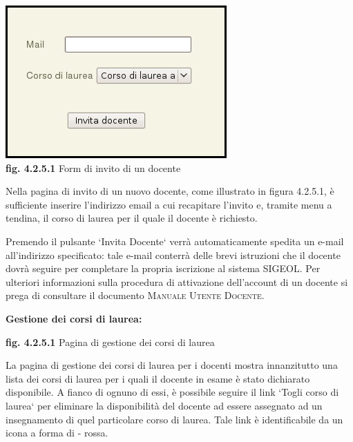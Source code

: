 \documentclass[11pt,a4paper]{article}
\begin{document}
\bigskip
\begin{center}
	\includegraphics[scale=0.5]{images/invito_docenti.jpg}\\
	\textbf{fig. 4.2.5.1} Form di invito di un docente\\
\end{center}
\bigskip

Nella pagina di invito di un nuovo docente, come illustrato in figura 4.2.5.1, è sufficiente inserire l'indirizzo email a cui recapitare l'invito e, tramite menu a tendina, il corso di laurea per il quale il docente è richiesto.

Premendo il pulsante `Invita Docente` verrà automaticamente spedita un e-mail all'indirizzo specificato: tale e-mail conterrà delle brevi istruzioni che il docente dovrà seguire per completare la propria iscrizione al sistema SIGEOL.
Per ulteriori informazioni sulla procedura di attivazione dell'account di un docente si prega di consultare il documento \textsc{Manuale Utente Docente}.
\newline \newline
\begin{large}\textbf{Gestione dei corsi di laurea:}\end{large}

\bigskip
\begin{center}
	\textbf{fig. 4.2.5.1} Pagina di gestione dei corsi di laurea\\
\end{center}
\bigskip

La pagina di gestione dei corsi di laurea per i docenti mostra innanzitutto una lista dei corsi di laurea per i quali il docente in esame è stato dichiarato disponibile. A fianco di ognuno di essi, è possibile seguire il link `Togli corso di laurea` per eliminare la disponibilità del docente ad essere assegnato ad un insegnamento di quel particolare corso di laurea. Tale link è identificabile da un icona a forma di - rossa.
\end{document}
